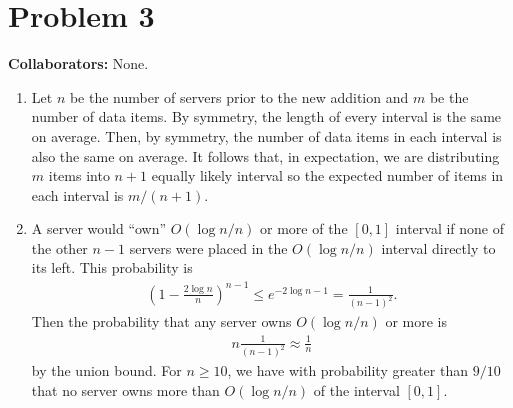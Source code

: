 \newpage
\section*{Problem 3}
\textbf{Collaborators:}  None.
\medskip

\begin{enumerate}
    \item
    Let $n$ be the number of servers
    prior to the new addition and $m$
    be the number of data items.
    By symmetry, the length of every
    interval is the same on average.
    Then, by symmetry,
    the number of data items in each interval
    is also the same on average.
    It follows that, in expectation, we are distributing
    $m$ items into $n+1$ equally likely interval
    so the expected number of items in each interval
    is $m/(n+1)$.
    
    
    \item A server would ``own'' $O(\log n/n)$
    or more of the $[0,1]$ interval
    if none of the other $n-1$ servers were placed
    in the $O(\log n/n)$ interval directly to its
    left.
    This probability is
    \begin{align}
        (1-\frac{2\log n}{n})^{n-1} \leq e^{-2\log n - 1}
        = \frac{1}{(n-1)^2}.
        \nonumber
    \end{align}
    Then the probability that any
    server owns $O(\log n/n)$ or more is
    \begin{align}
        n \frac{1}{(n-1)^2} \approx \frac{1}{n}
        \nonumber
    \end{align}
    by the union bound.
    For $n \geq 10$, we have with probability greater
    than $9/10$ that no server owns more
    than $O(\log n /n)$ of the interval $[0,1]$.
    

\end{enumerate}

